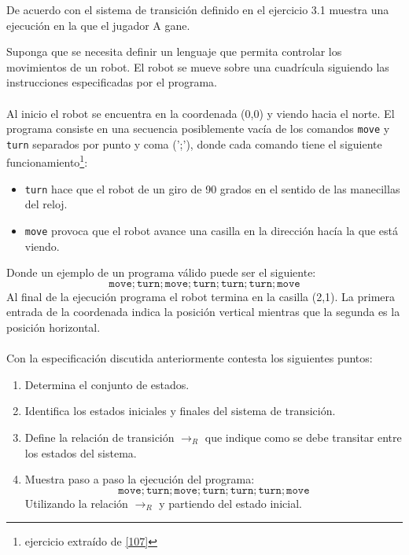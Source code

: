     \begin{exercise}
        De acuerdo con el sistema de transición definido en el ejercicio 3.1 muestra una ejecución en la que el jugador A gane.
    \end{exercise}

    \begin{exercise}
        Suponga que se necesita definir un lenguaje que permita controlar los movimientos de un robot. El robot se mueve sobre una cuadrícula siguiendo las instrucciones especificadas por el programa. \\\\
        Al inicio el robot se encuentra en la coordenada (0,0) y viendo hacia el norte. El programa consiste en una secuencia posiblemente 
        vacía de los comandos \texttt{move} y \texttt{turn} separados por punto y coma (';'), donde cada comando tiene el siguiente funcionamiento\footnote{ejercicio extraído de \hyperlink{107}{[107]}}:\\
    
        \begin{itemize}
            \item \texttt{turn} hace que el robot de un giro de 90 grados en el sentido de las manecillas del reloj.
            \item \texttt{move} provoca que el robot avance una casilla en la dirección hacía la que está viendo.\\
        \end{itemize}

        Donde un ejemplo de un programa válido puede ser el siguiente:
        \[   \texttt{move};\texttt{turn};\texttt{move};\texttt{turn};\texttt{turn};\texttt{turn};\texttt{move} \]
        Al final de la ejecución programa el robot termina en la casilla (2,1). La primera entrada de la coordenada
        indica la posición vertical mientras que la segunda es la posición horizontal.\\\\

        Con la especificación discutida anteriormente contesta los siguientes puntos:\\

        \begin{enumerate}
            \item Determina el conjunto de estados. 
            \item Identifica los estados iniciales y finales del sistema de transición.
            \item Define la relación de transición $\rightarrow_R$ que indique como se debe transitar entre los estados del sistema.
            \item Muestra paso a paso la ejecución del programa:
                  \[  \texttt{move};\texttt{turn};\texttt{move};\texttt{turn};\texttt{turn};\texttt{turn};\texttt{move} \]
                  Utilizando la relación $\rightarrow_R$ y partiendo del estado inicial.
         \end{enumerate}

    \end{exercise}


